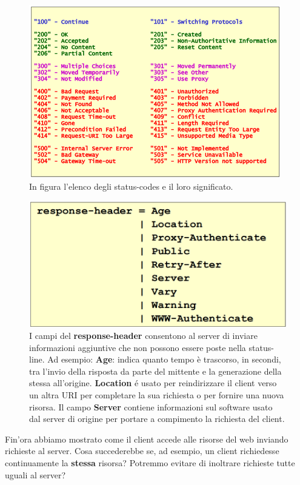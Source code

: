 \documentclass[11pt,a4paper]{article}
\theoremstyle{definition}
\begin{document}
\begin{figure}[!h]
	\includegraphics[scale=0.34]{Immagini/Stat_code.png}
	\centering
	\caption{In figura l'elenco degli status-codes e il loro significato.}
\end{figure}
\begin{figure}[!h]
	\includegraphics[scale=0.3]{Immagini/Resp_h.png}
	\centering
	\caption{I campi del \textbf{response-header} consentono al server di inviare informazioni aggiuntive che non possono essere poste nella status-line. Ad esempio: \textbf{Age}: indica quanto tempo è trascorso, in secondi, tra l'invio della risposta da parte del mittente e la generazione della stessa all'origine. \textbf{Location} é usato per reindirizzare il client verso un altra URI per completare la sua richiesta o per fornire una nuova risorsa. Il campo \textbf{Server} contiene informazioni sul software usato dal server di origine per portare a compimento la richiesta del client.}
\end{figure}
\newpage
Fin'ora abbiamo mostrato come il client accede alle risorse del web inviando richieste al server. Cosa succederebbe se, ad esempio, un client richiedesse continuamente la \textbf{stessa} risorsa? Potremmo evitare di inoltrare richieste tutte uguali al server?\newline
\end{document}
